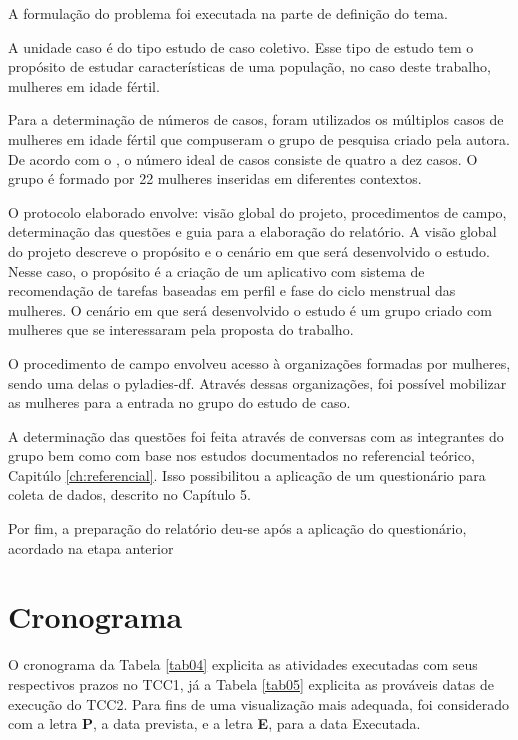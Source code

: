A formulação do problema foi executada na parte de definição do tema.

A unidade caso é do tipo estudo de caso coletivo. Esse tipo de estudo tem o propósito de estudar características
de uma população, no caso deste trabalho, mulheres em idade fértil.

Para a determinação de números de casos, foram utilizados os múltiplos casos de mulheres em idade fértil que compuseram o grupo de pesquisa criado pela autora. De acordo com o , 
o número ideal de casos consiste de quatro a dez casos. O grupo é formado por 22 mulheres inseridas em diferentes contextos.

O protocolo elaborado envolve: visão global do projeto, procedimentos de campo, determinação das questões e guia para a elaboração do relatório.
A visão global do projeto descreve o propósito e o cenário em que será desenvolvido o estudo. Nesse caso, o propósito é a criação de um aplicativo com sistema de recomendação de tarefas baseadas 
em perfil e fase do ciclo menstrual das mulheres. O cenário em que será desenvolvido o estudo é um grupo criado com mulheres que se interessaram pela proposta do trabalho.

O procedimento de campo envolveu acesso à organizações formadas por mulheres, sendo uma delas o pyladies-df. Através dessas organizações, foi possível mobilizar as mulheres 
para a entrada no grupo do estudo de caso.

A determinação das questões foi feita através de conversas com as 
integrantes do grupo bem como com base nos estudos documentados no 
referencial teórico, Capitúlo \ref{ch:referencial}. Isso possibilitou a aplicação de 
um questionário para coleta de dados, descrito no Capítulo 5.

Por fim, a preparação do relatório deu-se após a aplicação do questionário, acordado na etapa anterior
\section{Cronograma}

O cronograma da Tabela \ref{tab04} explicita as atividades executadas com seus respectivos prazos no TCC1, já a Tabela \ref{tab05} 
explicita as prováveis datas de execução do TCC2.
Para fins de uma visualização mais adequada, foi considerado com a letra \textbf{P}, a
data prevista, e a letra \textbf{E}, para a data Executada.

